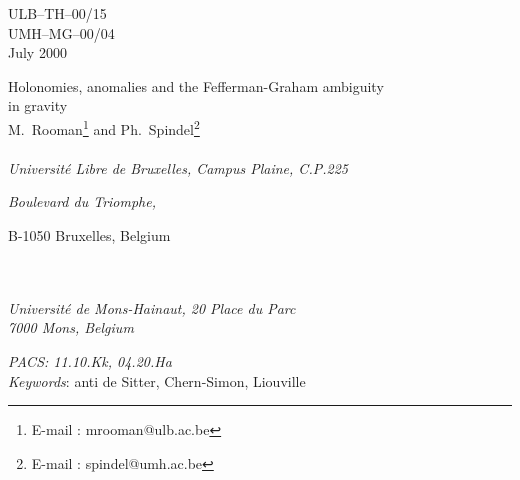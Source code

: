 \documentclass[a4paper,10pt]{article}
\begin{document}
 
 
\begin{flushright} ULB--TH--00/15 \\  UMH--MG--00/04 \\July 2000\\ \end{flushright} 
\vspace{.1cm} 
\begin{center} {\large Holonomies, anomalies 
and the Fefferman-Graham ambiguity\\  
\vspace{.1cm} in \coordHE{} gravity}\\ 
\vspace{.5cm} M.~Rooman\coordHE{}\footnote{ 
E-mail : mrooman@ulb.ac.be} and Ph.~Spindel\coordHE{}\footnote{ E-mail : 
spindel@umh.ac.be}\\ 
\vspace{.3cm}  {}\\  
{\it Universit\'e 
Libre de Bruxelles, Campus Plaine, C.P.225}\\ {\it Boulevard du Triomphe, 

B-1050 Bruxelles, Belgium}\\  
\vspace{.2cm} {}\\ {\it Universit\'e de Mons-Hainaut, 20 
Place du Parc}\\  
{\it 7000 Mons, Belgium}\\ \end{center} 
\vspace{.1cm} 
 
\providecommand{\asym}{\mathop {\simeq} \limits_{\bar r \rightarrow \infty}} 
\providecommand{\asymr}{\mathop {\simeq} \limits_{ r \rightarrow \infty}} 
\providecommand{\real}{{\hbox{{\rm I}\kern-.2em\hbox{\rm R}}}} 
 
\begin{abstract} 
Using the Chern-Simon formulation of (2+1) gravity,  
we derive, for the general asymptotic metrics given by the 
Fefferman-Graham-Lee theorems, the emergence of the Liouville mode  
associated to the boundary degrees of freedom of (2+1) dimensional  
anti de Sitter geometries. Holonomies are
described through multi-valued gauge and Liouville fields and
are found to algebraically couple the fields defined on
the disconnected components of spatial
infinity. In the case of flat boundary metrics, explicit 
expressions are obtained for the fields and holonomies.
We also show the link between the variation 
under diffeomorphisms of the Einstein theory of gravitation and 
the Weyl anomaly of the conformal theory at infinity.
\end{abstract}
\noindent
{\it PACS\/: 11.10.Kk, 04.20.Ha }\\
{\it Keywords}: anti de Sitter, Chern-Simon, Liouville
\end{document}
